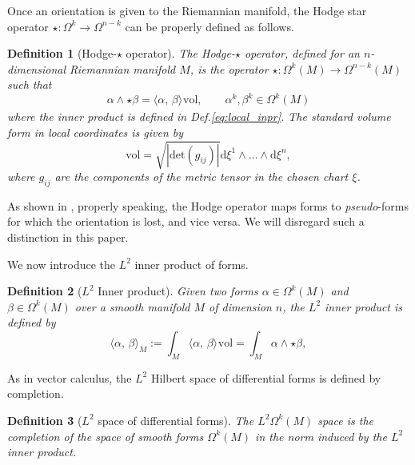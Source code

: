 \documentclass{elsarticle}
\newtheorem{definition}{Definition}
\renewcommand\d{\ensuremath{\mathrm{d}}}
\newcommand{\inpr}[3][]{\ensuremath{\langle #2, \, #3 \rangle_{#1}}}
\begin{document}
Once an orientation is given to the Riemannian manifold, the Hodge star operator $\star: \Omega^k \rightarrow \Omega^{n-k}$ can be properly defined as follows.
\begin{definition}[Hodge-$\star$ operator]
The Hodge-$\star$ operator, defined for an $n$-dimensional Riemannian manifold $M$, is the operator $\star : \Omega^k(M) \rightarrow \Omega^{n-k}(M)$ such that
\begin{equation*}
    \alpha \wedge \star \beta = \inpr{\alpha}{\beta} \mathrm{vol}, \qquad \alpha^k, \beta^k \in \Omega^k(M)
\end{equation*}
where the inner product is defined in Def.\ref{eq:local_inpr}. The standard volume form in local coordinates is given by
\begin{equation*}
    \mathrm{vol} = \sqrt{|\mathrm{det}(g_{ij})|} \d\xi^1 \wedge \dots \wedge \d\xi^n,
\end{equation*}
where $g_{ij}$ are the components of the metric tensor in the chosen chart $\xi$.
\end{definition}
As shown in \cite{frankel2011geometry}, properly speaking, the Hodge operator maps forms to {\it pseudo}-forms for which the orientation is lost, and vice versa. We will disregard such a distinction in this paper.

We now introduce the $L^2$ inner product of forms.

\begin{definition}[$L^2$ Inner product]
Given two forms $\alpha \in \Omega^k(M)$ and $\beta \in \Omega^{k}(M)$ over a smooth manifold $M$ of dimension $n$, the $L^2$ inner product is defined by
\begin{equation*}
    \inpr[M]{\alpha}{\beta} := \int_M \inpr{\alpha}{\beta} \mathrm{vol} = \int_M \alpha \wedge \star \beta,
\end{equation*}
\end{definition}
As in vector calculus, the $L^2$ Hilbert space of differential forms is defined by completion. 
\begin{definition}[$L^2$ space of differential forms]
    The $L^2\Omega^k(M)$ space is the completion of the space of smooth forms $\Omega^k(M)$ in the norm induced by the $L^2$ inner product.
\end{definition}
\end{document}
